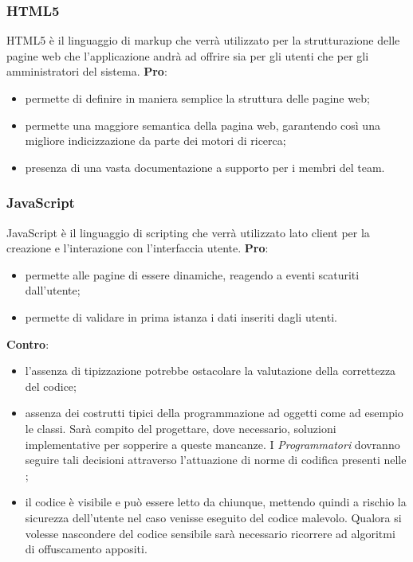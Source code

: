 
		\subsubsection{HTML5} %
		\label{ssub:html}
		HTML5 è il linguaggio di markup che verrà utilizzato per la strutturazione delle pagine web che l'applicazione andrà ad offrire sia per gli utenti che per gli amministratori del sistema. \newline
		\textbf{Pro}:
			\begin{itemize}
				\item permette di definire in maniera semplice la struttura delle pagine web;
				\item permette una maggiore semantica della pagina web, garantendo così una migliore indicizzazione da parte dei motori di ricerca;
				\item presenza di una vasta documentazione a supporto per i membri del team.
			\end{itemize}
			\noindent

		\subsubsection{JavaScript} %
		\label{ssub:javascript}
		JavaScript è il linguaggio di scripting che verrà utilizzato lato client per la creazione e l'interazione con l'interfaccia utente. \newline
		\textbf{Pro}:
			\begin{itemize}
				\item permette alle pagine di essere dinamiche, reagendo a eventi scaturiti dall'utente;
				\item permette di validare in prima istanza i dati inseriti dagli utenti.
			\end{itemize}
		\noindent
		\textbf{Contro}:
			\begin{itemize}
				\item l'assenza di tipizzazione potrebbe ostacolare la valutazione della correttezza del codice;
				\item assenza dei costrutti tipici della programmazione ad oggetti come ad esempio le classi. Sarà compito del \roleDesigner{} progettare, dove necessario, soluzioni implementative per sopperire a queste mancanze. I \emph{Programmatori} dovranno seguire tali decisioni attraverso l'attuazione di norme di codifica presenti nelle \docNameVersionNdP;
				\item il codice è visibile e può essere letto da chiunque, mettendo quindi a rischio la sicurezza dell'utente nel caso venisse eseguito del codice malevolo. Qualora si volesse nascondere del codice sensibile sarà necessario ricorrere ad algoritmi di offuscamento appositi.
			\end{itemize}
			\noindent

